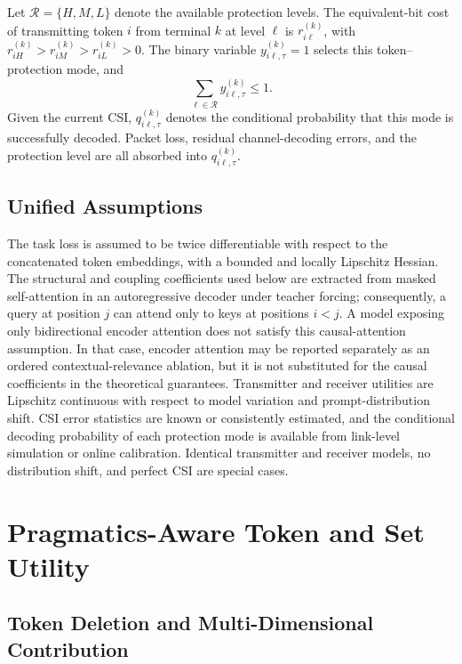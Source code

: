 \documentclass[journal]{IEEEtran}
\begin{document}
Let $\mathcal R=\{H,M,L\}$ denote the available protection levels. The equivalent-bit cost of transmitting token $i$ from terminal $k$ at level $\ell$ is $r_{i\ell}^{(k)}$, with $r_{iH}^{(k)}>r_{iM}^{(k)}>r_{iL}^{(k)}>0$. The binary variable $y_{i\ell,\tau}^{(k)}=1$ selects this token--protection mode, and
\begin{equation}
\sum_{\ell\in\mathcal R}y_{i\ell,\tau}^{(k)}\leq 1.
\label{eq:one_mode}
\end{equation}
Given the current CSI, $q_{i\ell,\tau}^{(k)}$ denotes the conditional probability that this mode is successfully decoded. Packet loss, residual channel-decoding errors, and the protection level are all absorbed into $q_{i\ell,\tau}^{(k)}$.

\subsection{Unified Assumptions}

The task loss is assumed to be twice differentiable with respect to the concatenated token embeddings, with a bounded and locally Lipschitz Hessian. The structural and coupling coefficients used below are extracted from masked self-attention in an autoregressive decoder under teacher forcing; consequently, a query at position $j$ can attend only to keys at positions $i<j$. A model exposing only bidirectional encoder attention does not satisfy this causal-attention assumption. In that case, encoder attention may be reported separately as an ordered contextual-relevance ablation, but it is not substituted for the causal coefficients in the theoretical guarantees. Transmitter and receiver utilities are Lipschitz continuous with respect to model variation and prompt-distribution shift. CSI error statistics are known or consistently estimated, and the conditional decoding probability of each protection mode is available from link-level simulation or online calibration. Identical transmitter and receiver models, no distribution shift, and perfect CSI are special cases.

\section{Pragmatics-Aware Token and Set Utility}
\label{sec:utility}

\subsection{Token Deletion and Multi-Dimensional Contribution}
\end{document}
